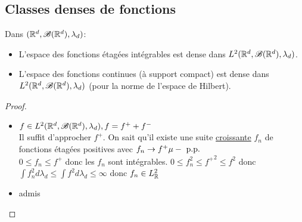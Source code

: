 \subsection{Classes denses de fonctions}

\begin{theorem}
	Dans $(\mathbb{R}^d, \mathscr{B} (\mathbb{R}^d), \lambda_d)$:

	\begin{itemize}
		\item L'espace des fonctions étagées intégrables est dense dans $L^2(\mathbb{R}^d, \mathscr{B} (\mathbb{R}^d), \lambda_d)$.
		\item L'espace des fonctions continues (à support compact) est dense dans $L^2(\mathbb{R}^d, \mathscr{B} (\mathbb{R}^d), \lambda_d)$ (pour la norme de l'espace de Hilbert).
	\end{itemize}
\end{theorem}

\begin{proof}
	\begin{itemize}
		\item $ f \in L^2(\mathbb{R}^d, \mathscr{B} (\mathbb{R}^d), \lambda_d), f = f^+ + f^-$\\
		      Il suffit d'approcher $f^+$. On sait qu'il existe une suite \underline{croissante} $f_n$ de fonctions étagées positives avec $f_n \to f^+ \mu-\text{ p.p.}$ \\
		      $0 \leq f_n \leq f^+$ donc les $f_n$ sont intégrables.
      $0\leq f_n^2 \leq {f^+}^2 \leq f^2$ donc $\int f_n^2 d \lambda_d \leq \int f^2d \lambda_d \le \infty$ donc $f_n \in L^2_{\mathbb{R}}$
		\item admis
	\end{itemize}
\end{proof}



